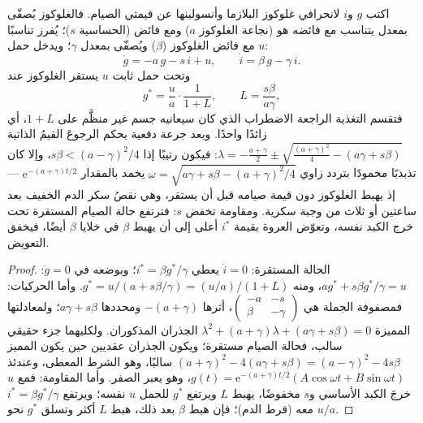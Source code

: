 \begin{theorem}\label{thm:b3:endocrinology:loop}
اكتب $g$ و$i$ لانحرافي غلوكوز البلازما وأنسولينها عن قيمتي
الصيام. فالغلوكوز يُصفّى بمعدل يتناسب مع فائضه هو (نجاعة
الغلوكوز $a$) ومع فائض  (الحساسية $s$)؛ 
يُفرز تناسبًا مع فائض الغلوكوز ($\beta$) ويُصفّى بمعدل
$\gamma$؛ ويدخل حمل $u$:
\[
\dot g = -a\,g - s\,i + u, \qquad \dot i = \beta\,g - \gamma\,i .
\]
وتحت حمل ثابت $u$ يستقر الغلوكوز عند
\[
g^{*} = \frac{u}{a}\cdot\frac{1}{1 + L}, \qquad L = \frac{s\beta}{a\gamma},
\]
فتقسم التغذية الراجعة الاضطراب الذي كان سيعانيه جسم غير
منظَّم على $1 + L$، أي \emph{} زائدًا واحدًا. وبعد
جرعة دفعية يحكم الرجوعَ القيمُ الذاتية
$\lambda = -\tfrac{a + \gamma}{2} \pm \sqrt{\tfrac{(a+\gamma)^{2}}{4} - (a\gamma + s\beta)}$:
فيكون رتيبًا إذا $s\beta < (a - \gamma)^{2}/4$، وإلا كان
تذبذبًا مخمودًا بتردد زاوي $\omega = \sqrt{a\gamma + s\beta -
(a+\gamma)^{2}/4}$ يخمد بالمقدار $\mathrm{e}^{-(a+\gamma)t/2}$ --- إذ
يهبط الغلوكوز دون قيمة صيامه قبل أن يستقر، وهي نقصُ سكر الدم
الخفيف بعد ساعتين أو ثلاث من وجبة سكرية. ومقاومة 
تخفض $s$: فترتفع حالة الصيام المستقرة تحت خرج الكبد نفسه،
وتعوّض العروة بقيمة $i^{*}$ أعلى إلى أن يهبط $\beta$ في خلايا
$\beta$ أيضًا، فيخفق التعويض.
\end{theorem}
\begin{proof}
الحالة المستقرة: $\dot i = 0$ يعطي $i^{*} = \beta g^{*}/\gamma$؛
وبوضعه في $\dot g = 0$: $a g^{*} + s\beta g^{*}/\gamma = u$، ومنه $g^{*} =
u/(a + s\beta/\gamma) = (u/a)/(1 + L)$. وأما الحركيات: فمصفوفة الجملة هي
$\begin{pmatrix} -a & -s\\ \beta & -\gamma\end{pmatrix}$، أثرها
$-(a+\gamma)$ ومحددها $a\gamma + s\beta$؛ ولمعادلتها المميزة
$\lambda^{2} + (a+\gamma)\lambda + (a\gamma + s\beta) = 0$ الجذران
المذكوران. ولكليهما جزء حقيقي سالب، فحالة الصيام مستقرة؛
ويكون الجذران عقديين حين يكون المميز $(a+\gamma)^{2}
- 4(a\gamma + s\beta) = (a-\gamma)^{2} - 4s\beta$ سالبًا، وهو الشرط
المعطى، وعندئذ $g(t) = \mathrm{e}^{-(a+\gamma)t/2}(A\cos\omega t
+ B\sin\omega t)$، وهو يعبر الصفر. وأما المقاومة: فمع $u$ خرجَ
الكبد الأساسي و$s$ مخفوضًا، يهبط $L$ ويرتفع $g^{*}$ للحمل $u$
نفسه؛ ويرتفع $i^{*} = \beta g^{*}/\gamma$ معه (فرط 
الدم)؛ فإن هبط $\beta$ بعد ذلك، هبط $L$ أكثر وتسلق $g^{*}$ نحو $u/a$.
\end{proof}

